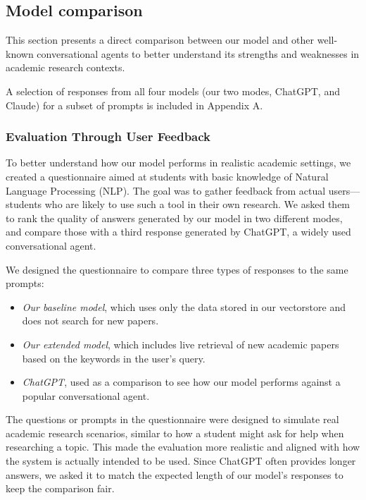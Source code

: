 \documentclass[fleqn,moreauthors,10pt]{ds_report}
\begin{document}
\subsection*{Model comparison}

This section presents a direct comparison between our model and other well-known conversational agents to better understand its strengths and weaknesses in academic research contexts. 

A selection of responses from all four models (our two modes, ChatGPT, and Claude) for a subset of prompts is included in Appendix A.

\subsubsection*{Evaluation Through User Feedback}

To better understand how our model performs in realistic academic settings, we created a questionnaire aimed at students with basic knowledge of Natural Language Processing (NLP). The goal was to gather feedback from actual users—students who are likely to use such a tool in their own research. We asked them to rank the quality of answers generated by our model in two different modes, and compare those with a third response generated by ChatGPT, a widely used conversational agent.

We designed the questionnaire to compare three types of responses to the same prompts:

\begin{itemize}
  \item \textit{Our baseline model}, which uses only the data stored in our vectorstore and does not search for new papers.
  \item \textit{Our extended model}, which includes live retrieval of new academic papers based on the keywords in the user's query.
  \item \textit{ChatGPT}, used as a comparison to see how our model performs against a popular conversational agent.
\end{itemize}

The questions or prompts in the questionnaire were designed to simulate real academic research scenarios, similar to how a student might ask for help when researching a topic. This made the evaluation more realistic and aligned with how the system is actually intended to be used. Since ChatGPT often provides longer answers, we asked it to match the expected length of our model’s responses to keep the comparison fair.
\end{document}
